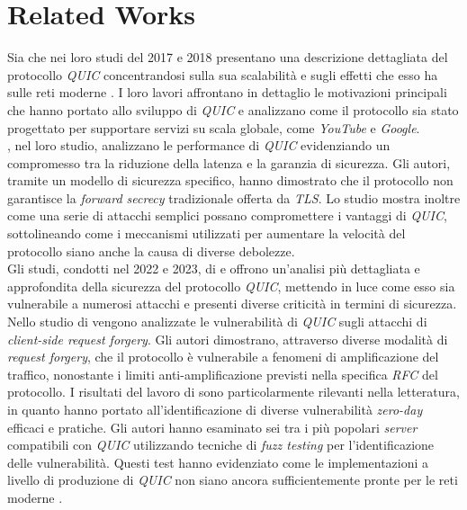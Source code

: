 \chapter{Related Works}
\label{cap:RelatedWorks}

Sia  che  nei loro studi del 2017 e 2018 presentano una descrizione dettagliata
del protocollo \emph{QUIC} concentrandosi sulla sua scalabilità e sugli effetti che esso ha sulle reti moderne \cite{article:handshake,article:wild}.
I loro lavori affrontano in dettaglio le motivazioni principali che hanno portato allo sviluppo di \emph{QUIC} e analizzano come il protocollo sia stato progettato per 
supportare servizi su scala globale, come \emph{YouTube} e \emph{Google}. \\
, nel loro studio, analizzano le performance di \emph{QUIC} evidenziando un compromesso tra la riduzione della latenza e la garanzia di sicurezza.
Gli autori, tramite un modello di sicurezza specifico, hanno dimostrato che il protocollo non garantisce la \emph{forward secrecy} tradizionale offerta da \emph{TLS}.
Lo studio mostra inoltre come una serie di attacchi semplici possano compromettere i vantaggi di \emph{QUIC}, 
sottolineando come i meccanismi utilizzati per aumentare la velocità del protocollo siano anche la causa di diverse debolezze.
\\
Gli studi, condotti nel 2022 e 2023, di \citeauthor{article:QuicAtt} e  offrono un'analisi più dettagliata e approfondita
della sicurezza del protocollo \emph{QUIC}, mettendo in luce come esso sia vulnerabile a numerosi attacchi e presenti diverse criticità in termini di sicurezza.
Nello studio di  vengono analizzate le vulnerabilità di \emph{QUIC} sugli attacchi di \emph{client-side request forgery}. Gli autori dimostrano, attraverso diverse modalità di \emph{request forgery},
che il protocollo è vulnerabile a fenomeni di amplificazione del traffico, nonostante i limiti anti-amplificazione previsti nella specifica \emph{RFC} del protocollo.
I risultati del lavoro di \citeauthor{article:QuicAtt} sono particolarmente rilevanti nella letteratura, 
in quanto hanno portato all'identificazione di diverse vulnerabilità \emph{zero-day} efficaci e pratiche. 
Gli autori hanno esaminato sei tra i più popolari \emph{server} compatibili con \emph{QUIC} utilizzando tecniche di \emph{fuzz testing} per l'identificazione delle vulnerabilità.
Questi test hanno evidenziato come le implementazioni a livello di produzione di \emph{QUIC} non siano ancora sufficientemente pronte per le reti moderne \cite{article:QuicAtt,article:forge}.
